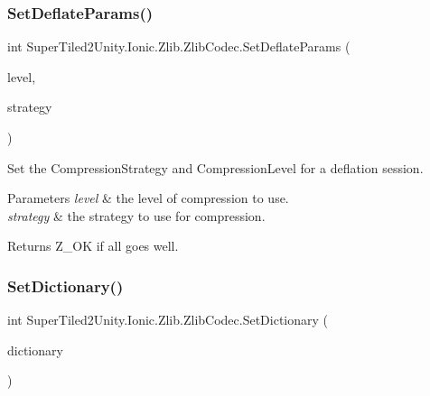 \subsubsection{\texorpdfstring{Set\+Deflate\+Params()}{SetDeflateParams()}}
{\footnotesize\ttfamily int Super\+Tiled2\+Unity.\+Ionic.\+Zlib.\+Zlib\+Codec.\+Set\+Deflate\+Params (\begin{DoxyParamCaption}\item[{\mbox{\hyperlink{namespace_super_tiled2_unity_1_1_ionic_1_1_zlib_a20f6771804996c363f454ad9765cd7db}{Compression\+Level}}}]{level,  }\item[{\mbox{\hyperlink{namespace_super_tiled2_unity_1_1_ionic_1_1_zlib_abde5c10a1e2ee453e1e8e22e79a39a3b}{Compression\+Strategy}}}]{strategy }\end{DoxyParamCaption})}



Set the Compression\+Strategy and Compression\+Level for a deflation session. 


\begin{DoxyParams}{Parameters}
{\em level} & the level of compression to use.\\
\hline
{\em strategy} & the strategy to use for compression.\\
\hline
\end{DoxyParams}
\begin{DoxyReturn}{Returns}
Z\+\_\+\+OK if all goes well.
\end{DoxyReturn}
\mbox{\label{class_super_tiled2_unity_1_1_ionic_1_1_zlib_1_1_zlib_codec_a0d2bbfa7f01f3ddaa8637ab022aa61af}} 
\subsubsection{\texorpdfstring{Set\+Dictionary()}{SetDictionary()}}
{\footnotesize\ttfamily int Super\+Tiled2\+Unity.\+Ionic.\+Zlib.\+Zlib\+Codec.\+Set\+Dictionary (\begin{DoxyParamCaption}\item[{byte \mbox{[}$\,$\mbox{]}}]{dictionary }\end{DoxyParamCaption})}



